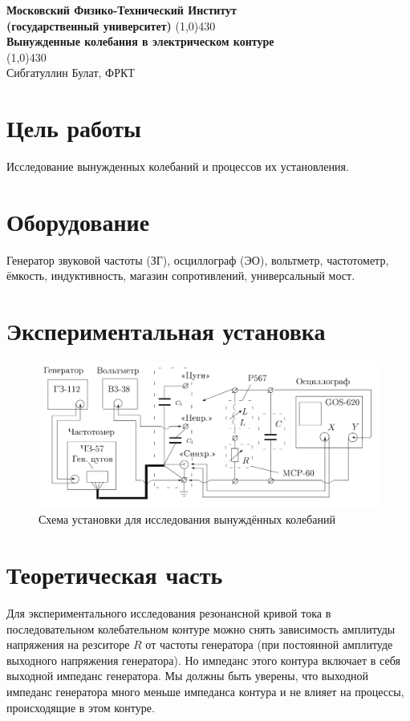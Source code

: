 \documentclass[a4paper, 12pt]{article}%
\begin{document}
\begin{titlepage}

\begin{center}
\large\textbf{Московский Физико-Технический Институт}\\
\large\textbf{(государственный университет)}
\vfill
\line(1,0){430}\\[1mm]
\huge\textbf{Вынужденные колебания в электрическом контуре}\\
\line(1,0){430}\\[1mm]
\vfill
\large Сибгатуллин Булат, ФРКТ\\
\end{center}

\end{titlepage}

\section*{Цель работы}
	Исследование вынужденных колебаний и процессов их установления.
	\section*{Оборудование}
	Генератор звуковой частоты (ЗГ), осциллограф (ЭО), вольтметр, частотометр, ёмкость, индуктивность, магазин сопротивлений, универсальный мост.
	\section*{Экспериментальная установка}
	\begin{figure}[h!]
		\includegraphics[width = 1.0\linewidth]{ust.png}
	\caption{Схема установки для исследования вынуждённых колебаний}
	\end{figure}
	\section*{Теоретическая часть}
	Для экспериментального исследования резонансной кривой тока в последовательном колебательном контуре можно снять зависимость амплитуды напряжения на резситоре $R$ от частоты генератора (при постоянной амплитуде выходного напряжения генератора). Но импеданс этого контура включает в себя выходной импеданс генератора. Мы должны быть уверены, что выходной импеданс генератора много меньше импеданса контура и не влияет на процессы, происходящие в этом контуре.
	
\end{document}
